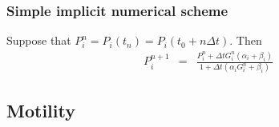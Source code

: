 \documentclass[12pt]{article}
\newcommand{\beqa}{\begin{eqnarray}}
\newcommand{\eeqa}{\end{eqnarray}}
\begin{document}
\subsubsection{Simple implicit numerical scheme}
Suppose that $P_i^n = P_i( t_n ) = P_i ( t_0 + n \Delta t)$. Then 
\beqa
P^{n+1}_i 
& = & 
\frac{ P_i^n + \Delta t G_i^n \left( \alpha_i + \beta_i \right) }{ 1 + \Delta t \left( \alpha_i G_i^n + \beta_i \right)}
\eeqa


\subsection{Motility}
\end{document}
